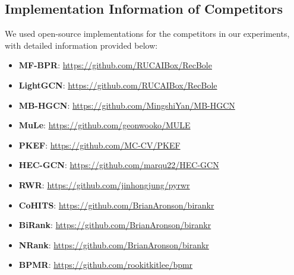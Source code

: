 \subsection{Implementation Information of Competitors}
\label{sec:appendix:competitors:information}
We used open-source implementations for the competitors in our experiments, with detailed information provided below:
\begin{itemize}[leftmargin=9mm,noitemsep]
    \item{ 
        \textbf{MF-BPR}: \url{https://github.com/RUCAIBox/RecBole} 
    }
    \item{
        \textbf{LightGCN}: \url{        https://github.com/RUCAIBox/RecBole}
    }
    \item{
        \textbf{MB-HGCN}: 
        \url{https://github.com/MingshiYan/MB-HGCN}
    }
    \item{
        \textbf{MuLe}: \url{https://github.com/geonwooko/MULE}
    }
    \item{
        \textbf{PKEF}: \url{https://github.com/MC-CV/PKEF}
    }
    \item{
        \textbf{HEC-GCN}: \url{https://github.com/marqu22/HEC-GCN}
    }
    \item{
        \textbf{RWR}: \url{https://github.com/jinhongjung/pyrwr}
    }
    \item{
        \textbf{CoHITS}: \url{https://github.com/BrianAronson/birankr}
    }
    \item{
        \textbf{BiRank}: \url{https://github.com/BrianAronson/birankr}
    }
    \item{
        \textbf{NRank}: \url{https://github.com/BrianAronson/birankr}
    }
    \item{
        \textbf{BPMR}: \url{https://github.com/rookitkitlee/bpmr}
    }
\end{itemize}
